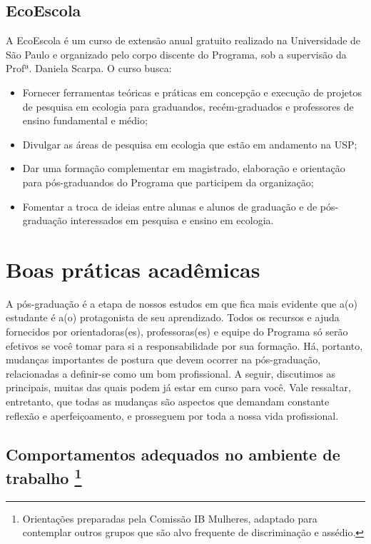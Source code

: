 \documentclass[twoside a4paper 12pt]{report}
\begin{document}
\section{EcoEscola}
\label{ecoescola}

A EcoEscola é um curso de extensão anual gratuito realizado na Universidade de São Paulo e organizado pelo corpo discente do Programa, sob a supervisão da Profª. Daniela Scarpa. O curso busca:

\begin{itemize}
\item Fornecer ferramentas teóricas e práticas em concepção e execução de projetos de pesquisa em ecologia para graduandos, recém-graduados e professores de ensino fundamental e médio;
\item Divulgar as áreas de pesquisa em ecologia que estão em andamento na USP;
\item Dar uma formação complementar em magistrado, elaboração e orientação para pós-graduandos do Programa que participem da organização;
\item Fomentar a troca de ideias entre alunas e alunos de graduação e de pós-graduação interessados em pesquisa e ensino em ecologia.
\end{itemize}


\chapter[Boas práticas acadêmicas]{Boas práticas acadêmicas}
\label{sec:boasprat}

A pós-graduação é a etapa de nossos estudos em que fica mais evidente que a(o) estudante é a(o) protagonista de seu aprendizado. Todos os recursos e ajuda fornecidos por orientadoras(es), professoras(es) e equipe do Programa só serão efetivos se você tomar para si a responsabilidade por sua formação. Há, portanto, mudanças importantes de postura que devem ocorrer na pós-graduação, relacionadas a definir-se como um bom profissional. A seguir, discutimos as principais, muitas das quais podem já estar em curso para você. Vale ressaltar, entretanto, que todas as mudanças são aspectos que demandam constante reflexão e aperfeiçoamento, e prosseguem por toda a nossa vida profissional.

\section[Comportamentos adequados no ambiente de trabalho]{Comportamentos adequados no ambiente de trabalho \footnote{Orientações preparadas pela Comissão IB Mulheres, adaptado para contemplar outros grupos que são alvo frequente de discriminação e assédio.}} 
\end{document}
